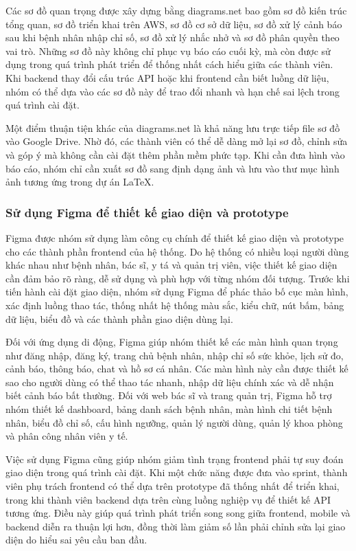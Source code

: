 \par Các sơ đồ quan trọng được xây dựng bằng diagrams.net bao gồm sơ đồ kiến trúc tổng quan, sơ đồ triển khai trên AWS, sơ đồ cơ sở dữ liệu, sơ đồ xử lý cảnh báo sau khi bệnh nhân nhập chỉ số, sơ đồ xử lý nhắc nhở và sơ đồ phân quyền theo vai trò. Những sơ đồ này không chỉ phục vụ báo cáo cuối kỳ, mà còn được sử dụng trong quá trình phát triển để thống nhất cách hiểu giữa các thành viên. Khi backend thay đổi cấu trúc API hoặc khi frontend cần biết luồng dữ liệu, nhóm có thể dựa vào các sơ đồ này để trao đổi nhanh và hạn chế sai lệch trong quá trình cài đặt.

\par Một điểm thuận tiện khác của diagrams.net là khả năng lưu trực tiếp file sơ đồ vào Google Drive. Nhờ đó, các thành viên có thể dễ dàng mở lại sơ đồ, chỉnh sửa và góp ý mà không cần cài đặt thêm phần mềm phức tạp. Khi cần đưa hình vào báo cáo, nhóm chỉ cần xuất sơ đồ sang định dạng ảnh và lưu vào thư mục hình ảnh tương ứng trong dự án LaTeX.

\subsubsection{Sử dụng Figma để thiết kế giao diện và prototype}
\par Figma được nhóm sử dụng làm công cụ chính để thiết kế giao diện và prototype cho các thành phần frontend của hệ thống. Do hệ thống có nhiều loại người dùng khác nhau như bệnh nhân, bác sĩ, y tá và quản trị viên, việc thiết kế giao diện cần đảm bảo rõ ràng, dễ sử dụng và phù hợp với từng nhóm đối tượng. Trước khi tiến hành cài đặt giao diện, nhóm sử dụng Figma để phác thảo bố cục màn hình, xác định luồng thao tác, thống nhất hệ thống màu sắc, kiểu chữ, nút bấm, bảng dữ liệu, biểu đồ và các thành phần giao diện dùng lại.

\par Đối với ứng dụng di động, Figma giúp nhóm thiết kế các màn hình quan trọng như đăng nhập, đăng ký, trang chủ bệnh nhân, nhập chỉ số sức khỏe, lịch sử đo, cảnh báo, thông báo, chat và hồ sơ cá nhân. Các màn hình này cần được thiết kế sao cho người dùng có thể thao tác nhanh, nhập dữ liệu chính xác và dễ nhận biết cảnh báo bất thường. Đối với web bác sĩ và trang quản trị, Figma hỗ trợ nhóm thiết kế dashboard, bảng danh sách bệnh nhân, màn hình chi tiết bệnh nhân, biểu đồ chỉ số, cấu hình ngưỡng, quản lý người dùng, quản lý khoa phòng và phân công nhân viên y tế.

\par Việc sử dụng Figma cũng giúp nhóm giảm tình trạng frontend phải tự suy đoán giao diện trong quá trình cài đặt. Khi một chức năng được đưa vào sprint, thành viên phụ trách frontend có thể dựa trên prototype đã thống nhất để triển khai, trong khi thành viên backend dựa trên cùng luồng nghiệp vụ để thiết kế API tương ứng. Điều này giúp quá trình phát triển song song giữa frontend, mobile và backend diễn ra thuận lợi hơn, đồng thời làm giảm số lần phải chỉnh sửa lại giao diện do hiểu sai yêu cầu ban đầu.

